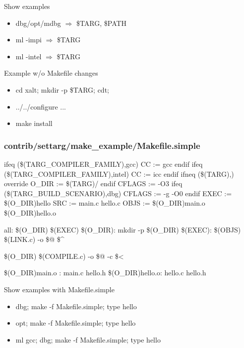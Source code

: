\documentclass{beamer}
\begin{document}
\begin{frame}{Show examples}
  \begin{itemize}
    \item dbg/opt/mdbg $\Rightarrow$ \$TARG, \$PATH
    \item ml -impi $\Rightarrow$ \$TARG
    \item ml -intel $\Rightarrow$ \$TARG
  \end{itemize}
\end{frame}

\begin{frame}{Example w/o Makefile changes}
  \begin{itemize}
    \item cd xalt; mkdir -p \$TARG; cdt; 
    \item ../../configure ...
    \item make install
  \end{itemize}
\end{frame}

\begin{frame}[fragile]
  \frametitle{contrib/settarg/make\_example/Makefile.simple}
    {\tiny
\begin{semiverbatim}
ifeq (\$(TARG\_COMPILER\_FAMILY),gcc)
   CC := gcc
endif
ifeq (\$(TARG\_COMPILER\_FAMILY),intel)
   CC := icc
endif
ifneq (\$(TARG),)
  override O\_DIR := \$(TARG)/
endif
CFLAGS := -O3
ifeq (\$(TARG\_BUILD_SCENARIO),dbg)
   CFLAGS := -g -O0
endif 
EXEC := \$(O\_DIR)hello
SRC  := main.c hello.c
OBJS := \$(O\_DIR)main.o \$(O\_DIR)hello.o

all: \$(O\_DIR) \$(EXEC)
\$(O\_DIR):
        mkdir -p \$(O\_DIR)
\$(EXEC): \$(OBJS)
        \$(LINK.c) -o \$@ \$^

\$(O\_DIR)%
        \$(COMPILE.c) -o \$@ -c \$<

\$(O\_DIR)main.o : main.c hello.h
\$(O\_DIR)hello.o: hello.c hello.h
\end{semiverbatim}
    }
\end{frame}

\begin{frame}{Show examples with Makefile.simple }
  \begin{itemize}
    \item dbg; make -f Makefile.simple; type hello
    \item opt; make -f Makefile.simple; type hello
    \item ml gcc; dbg; make -f Makefile.simple; type hello
  \end{itemize}
\end{frame}
\end{document}
